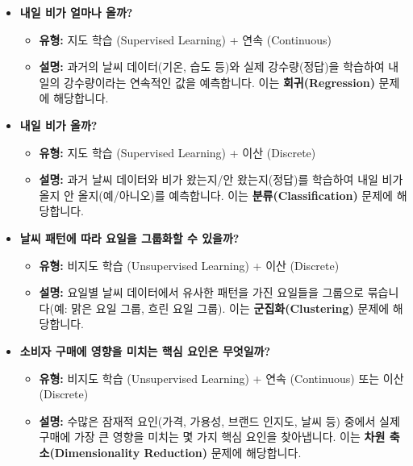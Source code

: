 \documentclass[11pt,a4paper]{article}
\theoremstyle{definition}
\begin{document}
\begin{tcolorbox}[examplebox={ML 학습 유형 예시}]
\begin{itemize}
    \item \textbf{내일 비가 얼마나 올까?}
    \begin{itemize}
        \item \textbf{유형:} 지도 학습 (Supervised Learning) + 연속 (Continuous)
        \item \textbf{설명:} 과거의 날씨 데이터(기온, 습도 등)와 실제 강수량(정답)을 학습하여 내일의 강수량이라는 연속적인 값을 예측합니다. 이는 \textbf{회귀(Regression)} 문제에 해당합니다.
    \end{itemize}
    \item \textbf{내일 비가 올까?}
    \begin{itemize}
        \item \textbf{유형:} 지도 학습 (Supervised Learning) + 이산 (Discrete)
        \item \textbf{설명:} 과거 날씨 데이터와 비가 왔는지/안 왔는지(정답)를 학습하여 내일 비가 올지 안 올지(예/아니오)를 예측합니다. 이는 \textbf{분류(Classification)} 문제에 해당합니다.
    \end{itemize}
    \item \textbf{날씨 패턴에 따라 요일을 그룹화할 수 있을까?}
    \begin{itemize}
        \item \textbf{유형:} 비지도 학습 (Unsupervised Learning) + 이산 (Discrete)
        \item \textbf{설명:} 요일별 날씨 데이터에서 유사한 패턴을 가진 요일들을 그룹으로 묶습니다(예: 맑은 요일 그룹, 흐린 요일 그룹). 이는 \textbf{군집화(Clustering)} 문제에 해당합니다.
    \end{itemize}
    \item \textbf{소비자 구매에 영향을 미치는 핵심 요인은 무엇일까?}
    \begin{itemize}
        \item \textbf{유형:} 비지도 학습 (Unsupervised Learning) + 연속 (Continuous) 또는 이산 (Discrete)
        \item \textbf{설명:} 수많은 잠재적 요인(가격, 가용성, 브랜드 인지도, 날씨 등) 중에서 실제 구매에 가장 큰 영향을 미치는 몇 가지 핵심 요인을 찾아냅니다. 이는 \textbf{차원 축소(Dimensionality Reduction)} 문제에 해당합니다.
    \end{itemize}
\end{itemize}
\end{tcolorbox}
\end{document}
